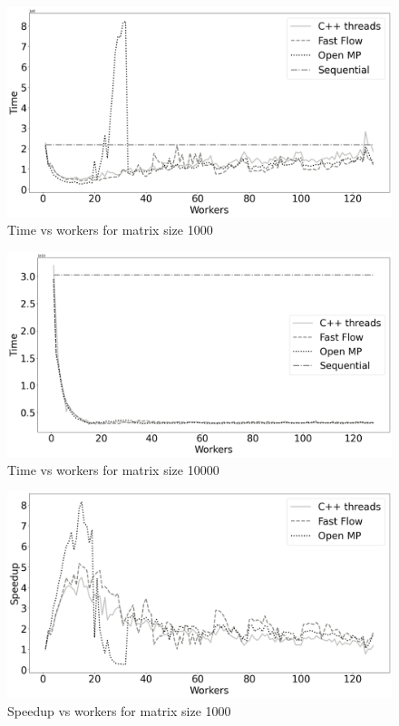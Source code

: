 \documentclass[12pt]{article}
\begin{document}
	
	\begin{figure}[H]
		\centering
		\includegraphics[width=13cm]{./images/time_vs_cores_1000}
		\caption{Time vs workers for matrix size 1000}
	\end{figure}
	
	\begin{figure}[H]
		\centering
		\includegraphics[width=13cm]{./images/time_vs_cores_10000}
		\caption{Time vs workers for matrix size 10000}
	\end{figure}

	\begin{figure}[H]
		\centering
		\includegraphics[width=13cm]{./images/speedup_vs_cores_1000}
		\caption{Speedup vs workers for matrix size 1000}
	\end{figure}
\end{document}
